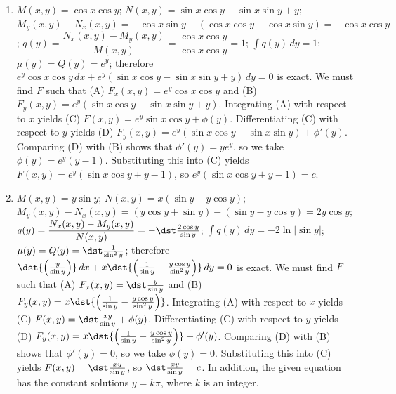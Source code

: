 \documentclass[openany]{book}
\newenvironment{sectionSolutions}{
 \begin{enumerate}[item-label={\thesection.\arabic{enumi}.}]
}{
 \end{enumerate}
}
\begin{document}
\begin{sectionSolutions}
\item
$M(x,y)=\cos x\cos y$;\;
$N(x,y)=\sin x\cos y-\sin x\sin y+y$;\;
$M_y(x,y)-N_x(x,y)=-\cos x\sin y-(\cos x\cos y-\cos x\sin y)
=-\cos x\cos y$;\;
$q(y)=\dfrac{N_x(x,y)-M_y(x,y)}{ M(x,y)}=\dfrac{\cos x\cos y
}{\cos x\cos y}=1$;\;
$\int q(y)\,dy=1$;\;
$\mu(y)=Q(y)=e^y$;
therefore
$e^y\cos x\cos y\,dx+e^y(\sin x\cos y-\sin x\sin y+y)\,dy=0$
is exact.
We must find $F$ such that
(A) $F_x(x,y)=e^y\cos x\cos y$ and
(B) $F_y(x,y)=e^y(\sin x\cos y-\sin x\sin y+y)$.
Integrating (A) with respect to $x$ yields
(C) $F(x,y)=e^y\sin x\cos y+\phi(y)$.
Differentiating (C) with respect to $y$  yields
(D) $F_y(x,y)=e^y(\sin x\cos y-\sin x\sin y)+\phi'(y)$.
Comparing (D) with (B)  shows that
$\phi'(y)=ye^y$, so we take
$\phi(y)=e^y(y-1)$.
Substituting this into (C) yields
$F(x,y)=e^y(\sin x\cos y+y-1)$,
so $e^y(\sin x\cos y+y-1)=c$.

\item
$M(x,y)=y\sin y$;\;
$N(x,y)=x(\sin y-y\cos y)$;\;
 $M_y(x,y)-N_x(x,y)=(y\cos y+\sin y)-(\sin y-y\cos y)=2y\cos y$;
$q(y)=\dfrac{N_x(x,y)-M_y(x,y)}{ N(x,y)}=-\dst\frac{2\cos y}{\sin y}$;\;
$\int q(y)\,dy=-2\ln|\sin y|$;\;
$\mu(y)=Q(y)=\dst\frac{1}{\sin^2y}$;
therefore
$\dst{\left(\frac{y}{\sin y}\right)}\,dx+
x\dst{\left(\frac{1}{\sin y}-\frac{y\cos y}{\sin^2y}\right)}\,dy=0$
is exact. We must find $F$ such that
(A) $F_x(x,y)=\dst\frac{y}{\sin y}$ and
(B) $F_y(x,y)=x\dst{\left(\frac{1}{\sin y}-\frac{y\cos y}{\sin^2y}\right)}$.
Integrating (A) with respect to $x$ yields
(C) $F(x,y)=\dst\frac{xy}{\sin y}+\phi(y)$.
Differentiating (C) with respect to $y$  yields
(D) $F_y(x,y)=x\dst{\left(\frac{1}{\sin y}-\frac{y\cos y}{\sin^2y}\right)}
+\phi'(y)$.
Comparing (D) with (B)  shows that
$\phi'(y)=0$, so we take
$\phi(y)=0$.
Substituting this into (C) yields
$F(x,y)=\dst\frac{xy}{\sin y}$,
so $\dst\frac{xy}{\sin y}=c$. In addition, the given equation has the
constant solutions $y=k\pi$, where $k$ is an integer.



\end{sectionSolutions}
\end{document}
